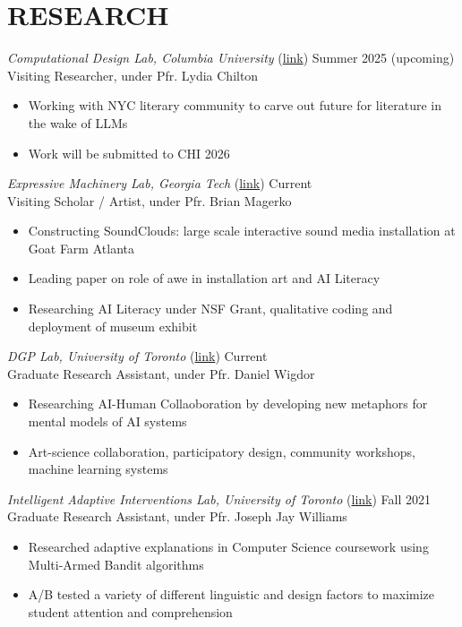 \section{RESEARCH}

{\sl Computational Design Lab, Columbia University} (\href{https://www.cs.columbia.edu/~chilton/chilton.html}{link})\hfill
Summer 2025 (upcoming) \\
Visiting Researcher, under Pfr. Lydia Chilton  \\
\begin{itemize}
\item Working with NYC literary community to carve out future for literature in the wake of LLMs
\item Work will be submitted to CHI 2026
\end{itemize}

{\sl Expressive Machinery Lab, Georgia Tech} (\href{https://expressivemachinery.gatech.edu/}{link})\hfill
Current \\
Visiting Scholar / Artist, under Pfr. Brian Magerko  \\
\begin{itemize}
\item Constructing SoundClouds: large scale interactive sound media installation at
Goat Farm Atlanta
\item Leading paper on role of awe in installation art and AI Literacy
\item Researching AI Literacy under NSF Grant, qualitative coding and deployment
of museum exhibit
\end{itemize}

{\sl DGP Lab, University of Toronto} (\href{https://www.dgp.toronto.edu/~dwigdor/}{link})\hfill
Current \\
Graduate Research Assistant, under Pfr. Daniel Wigdor \\
\begin{itemize}
\item Researching AI-Human Collaoboration by developing new metaphors for mental models of AI systems
\item  Art-science collaboration, participatory design, community workshops, machine learning systems
\end{itemize}

{\sl Intelligent Adaptive Interventions Lab, University of Toronto} (\href{http://www.josephjaywilliams.com/}{link})\hfill
Fall 2021 \\
Graduate Research Assistant, under Pfr. Joseph Jay Williams \\
\begin{itemize}
\item Researched adaptive explanations in Computer Science coursework using Multi-Armed Bandit algorithms
\item A/B tested a variety of different linguistic and design factors to maximize student attention and comprehension
\end{itemize}

